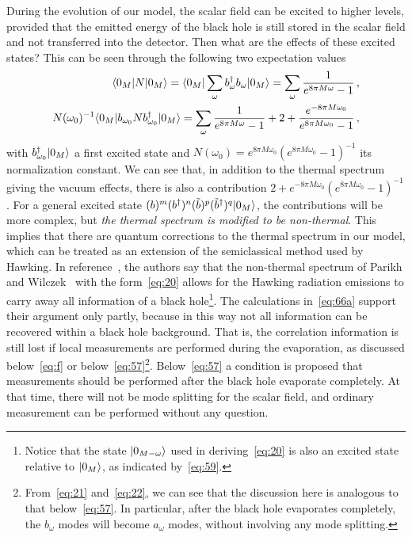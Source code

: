 \documentclass[12pt,a4paper]{article}
\begin{document}
During the evolution of our model, the scalar field can be excited to higher levels, provided that the emitted energy of the black hole is still stored in the scalar field and not transferred into the detector. Then what are the effects of these excited states? This can be seen through the following two expectation values
\begin{subequations}\label{eq:66a}
\begin{align}
\label{eq:66a:1} \langle0_M\arrowvert N\arrowvert0_M\rangle =
\langle0_M\arrowvert\sum_{\omega}b_{\omega}^{\dag}b_{\omega}\arrowvert0_M\rangle=\sum_{\omega}\frac{1}{e^{8\pi
M\omega}-1} \,,
\\
\label{eq:66a:2} N(\omega_0)^{-1}\langle0_M\arrowvert
b_{\omega_0}Nb_{\omega_0}^{\dag}\arrowvert0_M\rangle=\sum_{\omega}\frac{1}{e^{8\pi
M\omega}-1}+2+\frac{e^{-8\pi M\omega_0}}{e^{8\pi M\omega_0}-1} \,,
\end{align}
\end{subequations}
with $b_{\omega_0}^{\dag}\arrowvert0_M\rangle$ a first excited state and $N(\omega_0)=e^{8\pi M\omega_0}(e^{8\pi M\omega_0}-1)^{-1}$
its normalization constant. We can see that, in addition to the thermal spectrum giving the vacuum effects, there is also a contribution $2+e^{-8\pi M\omega_0}(e^{8\pi M\omega_0}-1)^{-1}$. For a general excited state $(b)^m(b^{\dag})^n(\tilde{b})^p(\tilde{b}^{\dag})^q\arrowvert0_M\rangle$, the contributions will be more complex, but \emph{the thermal spectrum is modified to be non-thermal}. This implies that there are quantum corrections to the thermal spectrum in our model, which can be treated as an extension of the semiclassical method used by Hawking. In reference~\cite{k1}, the authors say that the non-thermal spectrum of Parikh and Wilczek~\cite{k} with the form~\eqref{eq:20} allows for the Hawking radiation emissions to carry away all information of a black hole\footnote{Notice that the state $\arrowvert0_{M-\omega}\rangle$ used in deriving~\eqref{eq:20} is also an excited state relative to $\arrowvert0_M\rangle$, as indicated by~\eqref{eq:59}. }. The calculations in~\eqref{eq:66a} support their argument only partly, because in this way not all information can be recovered within a black hole background. That is, the correlation information is still lost if local measurements are performed during the evaporation, as discussed below~\eqref{eq:f} or below~\eqref{eq:57}\footnote{From~\eqref{eq:21} and~\eqref{eq:22}, we can see that the discussion here is analogous to that below~\eqref{eq:57}. In particular, after the black hole evaporates completely, the $b_{\omega}$ modes will become $a_{\omega}$ modes, without involving any mode splitting. }. Below~\eqref{eq:57} a condition is proposed that measurements should be performed after the black hole evaporate completely. At that time, there will not be mode splitting for the scalar field, and ordinary measurement can be performed without any question.
\end{document}
